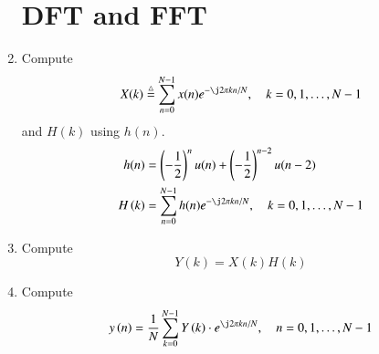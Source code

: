 \documentclass[journal,12pt,twocolumn]{IEEEtran}
\newcommand{\define}{\stackrel{\triangle}{=}}
\theoremstyle{remark}
\begin{document}
\begin{enumerate}[label=\thesection.\arabic*,ref=\thesection.\theenumi]
\section{DFT and FFT}

\item
Compute
\begin{equation}
X(k) \define \sum _{n=0}^{N-1}x(n) e^{-\j2\pi kn/N}, \quad k = 0,1,\dots, N-1
\end{equation}
and $H(k)$ using $h(n)$.\\
\solution
\begin{align}
    h(n) &= \brak{-\frac{1}{2}}^{n}u(n) + \brak{-\frac{1}{2}}^{n-2}u(n-2)\\
    H\brak{k}&=\sum _{n=0}^{N-1}h(n) e^{-\j2\pi kn/N}, \quad k = 0,1,\dots, N-1
\end{align}
\item Compute 
\begin{equation}
Y(k) = X(k)H(k)
\label{eq:fp}
\end{equation}
\item Compute
\begin{equation}
y\brak{n}={\frac {1}{N}}\sum _{k=0}^{N-1}Y\brak{k}\cdot e^{\j 2\pi kn/N},\quad n = 0,1,\dots, N-1
\label{eq:inv-ft}
\end{equation}


\end{enumerate}
\end{document}
